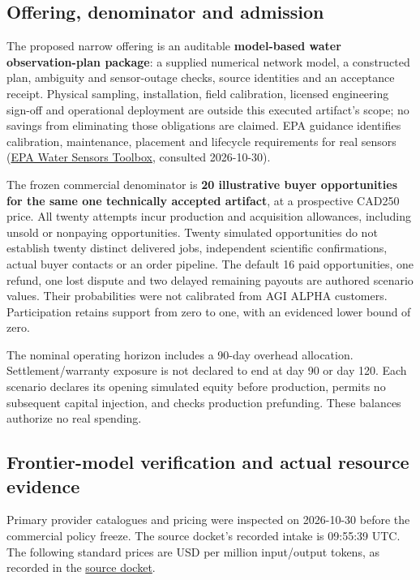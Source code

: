 \documentclass[
  11pt,
]{article}
\begin{document}
\hypertarget{offering-denominator-and-admission}{%
\subsection{Offering, denominator and
admission}\label{offering-denominator-and-admission}}

The proposed narrow offering is an auditable \textbf{model-based water
observation-plan package}: a supplied numerical network model, a
constructed plan, ambiguity and sensor-outage checks, source identities
and an acceptance receipt. Physical sampling, installation, field
calibration, licensed engineering sign-off and operational deployment
are outside this executed artifact's scope; no savings from eliminating
those obligations are claimed. EPA guidance identifies calibration,
maintenance, placement and lifecycle requirements for real sensors
(\href{https://www.epa.gov/water-research/water-sensors-toolbox}{EPA
Water Sensors Toolbox}, consulted 2026-10-30).

The frozen commercial denominator is \textbf{20 illustrative buyer
opportunities for the same one technically accepted artifact}, at a
prospective CAD250 price. All twenty attempts incur production and
acquisition allowances, including unsold or nonpaying opportunities.
Twenty simulated opportunities do not establish twenty distinct
delivered jobs, independent scientific confirmations, actual buyer
contacts or an order pipeline. The default 16 paid opportunities, one
refund, one lost dispute and two delayed remaining payouts are authored
scenario values. Their probabilities were not calibrated from AGI ALPHA
customers. Participation retains support from zero to one, with an
evidenced lower bound of zero.

The nominal operating horizon includes a 90-day overhead allocation.
Settlement/warranty exposure is not declared to end at day 90 or day
120. Each scenario declares its opening simulated equity before
production, permits no subsequent capital injection, and checks
production prefunding. These balances authorize no real spending.

\hypertarget{frontier-model-verification-and-actual-resource-evidence}{%
\subsection{Frontier-model verification and actual resource
evidence}\label{frontier-model-verification-and-actual-resource-evidence}}

Primary provider catalogues and pricing were inspected on 2026-10-30
before the commercial policy freeze. The source docket's recorded intake
is 09:55:39 UTC. The following standard prices are USD per million
input/output tokens, as recorded in the
\href{https://github.com/MontrealAI/AGI-Alpha-Invention-Flywheel-Lab/blob/b0d828309f14ef4dc278dc522739df85db43c460/research/next009/commerce/source_docket.json}{source
docket}.
\end{document}
